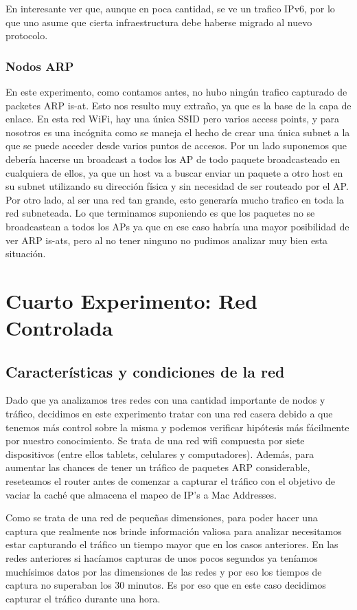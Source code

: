 \documentclass{article}
\theoremstyle{definition}
\theoremstyle{remark}
\begin{document}
En interesante ver que, aunque en poca cantidad, se ve un trafico IPv6, por lo que uno asume que cierta infraestructura debe haberse migrado al nuevo protocolo.

\subsubsection{Nodos ARP}
En este experimento, como contamos antes, no hubo ningún trafico capturado de packetes ARP is-at. Esto nos resulto muy extraño, ya que es la base de la capa de enlace. En esta red WiFi, hay una única SSID pero varios access points, y para nosotros es una incógnita como se maneja el hecho de crear una única subnet a la que se puede acceder desde varios puntos de accesos. Por un lado suponemos que debería hacerse un broadcast a todos los AP de todo paquete broadcasteado en cualquiera de ellos, ya que un host va a buscar enviar un paquete a otro host en su subnet utilizando su dirección física y sin necesidad de ser routeado por el AP. Por otro lado, al ser una red tan grande, esto generaría mucho trafico en toda la red subneteada. Lo que terminamos suponiendo es que los paquetes no se broadcastean a todos los APs ya que en ese caso habría una mayor posibilidad de ver ARP is-ats, pero al no tener ninguno no pudimos analizar muy bien esta situación.

\newpage
\section{Cuarto Experimento: Red Controlada}
\subsection{Características y condiciones de la red}
Dado que ya analizamos tres redes con una cantidad importante de nodos y tráfico, decidimos en este experimento tratar con una red casera debido a que tenemos más control sobre la misma y podemos verificar hipótesis más fácilmente por nuestro conocimiento. Se trata de una red wifi compuesta por siete dispositivos (entre ellos tablets, celulares y computadores). Además, para aumentar las chances de tener un tráfico de paquetes ARP considerable, reseteamos el router antes de comenzar a capturar el tráfico con el objetivo de vaciar la caché que almacena el mapeo de IP's a Mac Addresses.
\par Como se trata de una red de pequeñas dimensiones, para poder hacer una captura que realmente nos brinde información valiosa para analizar necesitamos estar capturando el tráfico un tiempo mayor que en los casos anteriores. En las redes anteriores si hacíamos capturas de unos pocos segundos ya teníamos muchísimos datos por las dimensiones de las redes y por eso los tiempos de captura no superaban los 30 minutos. Es por eso que en este caso decidimos capturar el tráfico durante una hora.
\end{document}
